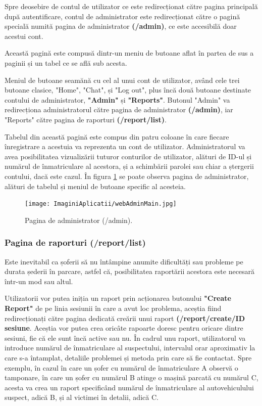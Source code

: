 \documentclass[12pt]{article}
\begin{document}
Spre deosebire de contul de utilizator ce este redirecționat c\u{a}tre pagina principal\u{a} dup\u{a} autentificare, contul de administrator este redirecționat c\u{a}tre o pagin\u{a} special\u{a} numit\u{a} pagina de administrator \textbf{(/admin)}, ce este accesibil\u{a} doar acestui cont.

Aceast\u{a} pagin\u{a} este compus\u{a} dintr-un meniu de butoane aflat \^{i}n partea de sus a paginii și un tabel ce se afl\u{a} sub acesta. 

Meniul de butoane seam\u{a}n\u{a} cu cel al unui cont de utilizator, av\^{a}nd cele trei butoane clasice, "Home", "Chat", și "Log out", plus \^{i}nc\u{a} dou\u{a} butoane destinate contului de administrator, \textbf{"Admin"} și \textbf{"Reports"}. Butonul "Admin" va redirecționa administratorul c\u{a}tre pagina de administrator \textbf{(/admin)}, iar "Reports" c\u{a}tre pagina de raporturi \textbf{(/report/list)}.

Tabelul din aceast\u{a} pagin\u{a} este compus din patru coloane \^{i}n care fiecare \^{i}nregistrare a acestuia va reprezenta un cont de utilizator. Administratorul va avea posibilitatea vizualiz\u{a}rii tuturor conturilor de utilizator, al\u{a}turi de ID-ul și num\u{a}rul de \^{i}nmatriculare al acestora, și a schimb\u{a}rii parolei sau chiar a ștergerii contului, dac\u{a} este cazul. \^{I}n figura \ref{fig:aplicatie_admin_main} se poate observa pagina de administrator, al\u{a}turi de tabelul și meniul de butoane specific al acesteia.

\begin{figure}[H]
  \centering
  \texttt{[image: ImaginiAplicatii/webAdminMain.jpg]}
  \caption{Pagina de administrator (/admin).}
  \label{fig:aplicatie_admin_main}
\end{figure}

\subsubsection{Pagina de raporturi (/report/list)}

Este inevitabil ca șoferii s\u{a} nu \^{i}nt\^{a}mpine anumite dificult\u{a}ți sau probleme pe durata șederii \^{i}n parcare, astfel c\u{a}, posibilitatea raport\u{a}rii acestora este necesar\u{a} \^{i}ntr-un mod sau altul.

Utilizatorii vor putea iniția un raport prin acționarea butonului \textbf{"Create Report"} de pe linia sesiunii \^{i}n care a avut loc problema, aceștia fiind redirecționați c\u{a}tre pagina dedicat\u{a} cre\u{a}rii unui raport \textbf{(/report/create/{ID sesiune}}. Aceștia vor putea crea oric\^{a}te rapoarte doresc pentru oricare dintre sesiuni, fie c\u{a} ele sunt \^{i}nc\u{a} active sau nu. \^{I}n cadrul unu raport, utilizatorul va introduce num\u{a}rul de \^{i}nmatriculare al suspectului, intervalul orar aproximativ la care s-a \^{i}ntamplat, detaliile problemei și metoda prin care s\u{a} fie contactat. Spre exemplu, \^{i}n cazul \^{i}n care un șofer cu num\u{a}rul de \^{i}nmatriculare A observ\u{a} o tamponare, \^{i}n care un șofer cu num\u{a}rul B atinge o mașin\u{a} parcat\u{a} cu num\u{a}rul C, acesta va crea un raport specific\^{a}nd num\u{a}rul de \^{i}nmatriculare al autovehiculului suspect, adic\u{a} B, și al victimei \^{i}n detalii, adic\u{a} C.
\end{document}
